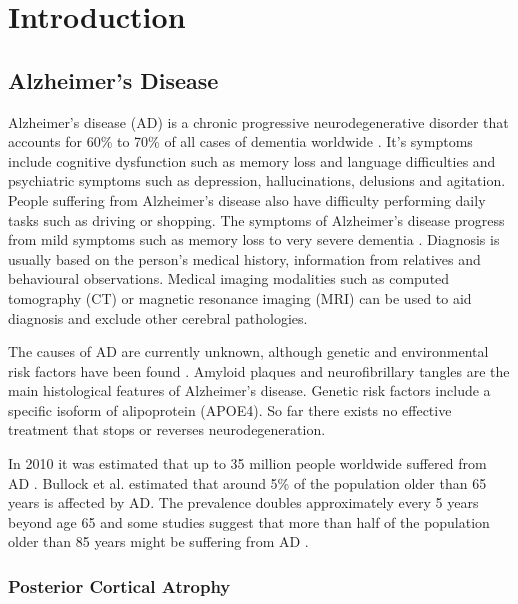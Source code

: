 \chapter{Introduction}
\label{chapter:intro}

\section{Alzheimer's Disease}

Alzheimer's disease (AD) is a chronic progressive neurodegenerative disorder that accounts for 60\% to 70\% of all cases of dementia worldwide \cite{Burns2009,world2013dementia}. It's symptoms include cognitive dysfunction such as memory loss and language difficulties and psychiatric symptoms such as depression, hallucinations, delusions and agitation. People suffering from Alzheimer's disease also have difficulty performing daily tasks such as driving or shopping. The symptoms of Alzheimer's disease progress from mild symptoms such as memory loss to very severe dementia \cite{Burns2009}. Diagnosis is usually based on the person's medical history, information from relatives and behavioural observations. Medical imaging modalities such as computed tomography (CT) or magnetic resonance imaging (MRI) can be used to aid diagnosis and exclude other cerebral pathologies. 

The causes of AD are currently unknown, although genetic and environmental risk factors have been found \cite{Burns2009}. Amyloid plaques and neurofibrillary tangles are the main histological features of Alzheimer's disease. Genetic risk factors include a specific isoform of alipoprotein (APOE4). So far there exists no effective treatment that stops or reverses neurodegeneration. 

In 2010 it was estimated that up to 35 million people worldwide suffered from AD \cite{world2013dementia}. Bullock et al. \cite{bullock2004future} estimated that around 5\% of the population older than 65 years is affected by AD. The prevalence doubles approximately every 5 years beyond age 65 \cite{klafki2006therapeutic,cummings2004alzheimers} and some studies suggest that more than half of the population older than 85 years might be suffering from AD \cite{klafki2006therapeutic,forsyth1998overview}.

\subsection{Posterior Cortical Atrophy}

